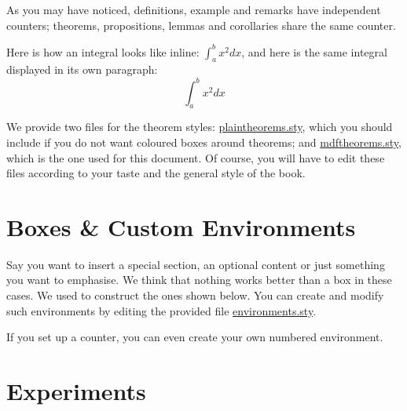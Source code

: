 As you may have noticed, definitions, example and remarks have 
independent counters; theorems, propositions, lemmas and corollaries 
share the same counter.

\begin{remark}
Here is how an integral looks like inline: $\int_{a}^{b} x^2 dx$, and 
here is the same integral displayed in its own paragraph:
\[\int_{a}^{b} x^2 dx\]
\end{remark}

We provide two files for the theorem styles: 
\href{style/plaintheorems.sty}{plaintheorems.sty}, which you should 
include if you do not want coloured boxes around theorems; and 
\href{style/mdftheorems.sty}{mdftheorems.sty}, which is the one used for 
this document. Of course, 
you will have to edit these files according to your taste and the 
general style of the book.

\section[Boxes \& Environments]{Boxes \& Custom Environments
}

Say you want to insert a special section, an optional content or just 
something you want to emphasise. We think that nothing works better than 
a box in these cases. We used  to construct the ones 
shown below. You can create and modify such environments by editing the 
provided file \href{style/environments.sty}{environments.sty}.

\begin{kaobox}[frametitle=Title of the box]
\blindtext
\end{kaobox}

If you set up a counter, you can even create your own numbered 
environment.

\begin{kaocounter}
	\blindtext
\end{kaocounter}

\section{Experiments}

